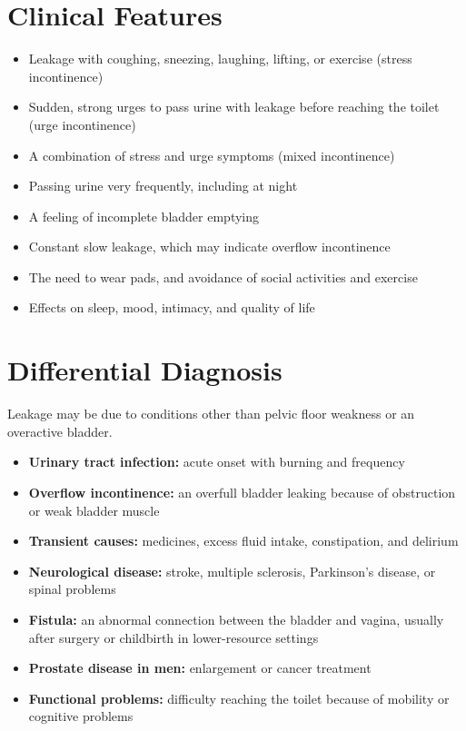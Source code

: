 \section*{Clinical Features}
\begin{itemize}
    \item Leakage with coughing, sneezing, laughing, lifting, or exercise (stress incontinence)
    \item Sudden, strong urges to pass urine with leakage before reaching the toilet (urge incontinence)
    \item A combination of stress and urge symptoms (mixed incontinence)
    \item Passing urine very frequently, including at night
    \item A feeling of incomplete bladder emptying
    \item Constant slow leakage, which may indicate overflow incontinence
    \item The need to wear pads, and avoidance of social activities and exercise
    \item Effects on sleep, mood, intimacy, and quality of life
\end{itemize}

\section*{Differential Diagnosis}
Leakage may be due to conditions other than pelvic floor weakness or an overactive bladder.
\begin{itemize}
    \item \textbf{Urinary tract infection:} acute onset with burning and frequency
    \item \textbf{Overflow incontinence:} an overfull bladder leaking because of obstruction or weak bladder muscle
    \item \textbf{Transient causes:} medicines, excess fluid intake, constipation, and delirium
    \item \textbf{Neurological disease:} stroke, multiple sclerosis, Parkinson's disease, or spinal problems
    \item \textbf{Fistula:} an abnormal connection between the bladder and vagina, usually after surgery or childbirth in lower-resource settings
    \item \textbf{Prostate disease in men:} enlargement or cancer treatment
    \item \textbf{Functional problems:} difficulty reaching the toilet because of mobility or cognitive problems
\end{itemize}

